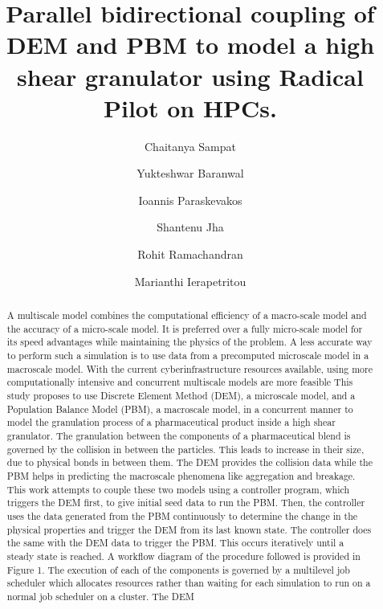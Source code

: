 \documentclass[preprint,11pt,authoryear]{elsarticle}
\begin{document}
\begin{frontmatter}

\title{Parallel bidirectional coupling of DEM and PBM to model a high shear granulator using
Radical Pilot on HPCs.}
\author[add1]{Chaitanya Sampat}
\author[add1]{Yukteshwar Baranwal}
\author[add2]{Ioannis Paraskevakos}
\author[add2]{Shantenu Jha}
\author[add1]{Rohit Ramachandran}
\author[add1]{Marianthi Ierapetritou}
\address[add1]{Department of Chemical and Biochemical Engineering, Rutgers, The State University of New
Jersey, Piscataway, NJ, USA-08854}
\address[add2]{Electrical and Computer Engineering, Rutgers, The State University of New Jersey, 
Piscataway, NJ, USA-08854}

\begin{abstract}
A multiscale model combines the computational efficiency of a macro-scale model and the 
accuracy of a micro-scale model. It is preferred over a fully micro-scale model for its speed 
advantages while maintaining the physics of the problem. A less accurate way to perform such a
simulation is to use data from a precomputed microscale model in a macroscale model. With the
current cyberinfrastructure resources available, using more computationally intensive and 
concurrent multiscale models are more feasible This study proposes to use Discrete Element Method
(DEM), a microscale model, and a Population Balance Model (PBM), a macroscale model, in a
concurrent manner to model the granulation process of a pharmaceutical product inside a high
shear granulator. The granulation between the components of a pharmaceutical blend is governed
by the collision in between the particles. This leads to increase in their size, due to physical bonds
in between them. The DEM provides the collision data while the PBM helps in predicting the
macroscale phenomena like aggregation and breakage. This work attempts to couple these two
models using a controller program, which triggers the DEM first, to give initial seed data to run
the PBM. Then, the controller uses the data generated from the PBM continuously to determine
the change in the physical properties and trigger the DEM from its last known state. The controller
does the same with the DEM data to trigger the PBM. This occurs iteratively until a steady state
is reached. A workflow diagram of the procedure followed is provided in Figure 1. The execution
of each of the components is governed by a multilevel job scheduler which allocates resources
rather than waiting for each simulation to run on a normal job scheduler on a cluster. The DEM

\end{abstract}
\end{frontmatter}
\end{document}
